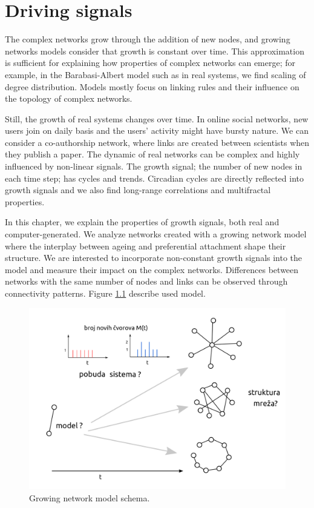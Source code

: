 
\chapter{Driving signals} %
\label{Ch:signals} %

The complex networks grow through the addition of new nodes, and growing networks models consider that growth is constant over time. This approximation is sufficient for explaining how properties of complex networks can emerge; for example, in the Barabasi-Albert model such as in real systems, we find scaling of degree distribution. Models mostly focus on linking rules and their influence on the topology of complex networks. 

Still, the growth of real systems changes over time. In online social networks, new users join on daily basis and the users' activity might have bursty nature. We can consider a co-authorship network, where links are created between scientists when they publish a paper. The dynamic of real networks can be complex and highly influenced by non-linear signals. The growth signal; the number of new nodes in each time step; has cycles and trends. Circadian cycles are directly reflected into growth signals and we also find long-range correlations and multifractal properties. 

In this chapter, we explain the properties of growth signals, both real and computer-generated. We analyze networks created with a growing network model where the interplay between ageing and preferential attachment shape their structure. We are interested to incorporate non-constant growth signals into the model and measure their impact on the complex networks. Differences between networks with the same number of nodes and links can be observed through connectivity patterns. Figure \ref{fig:ciljevi} describe used model. 
   

\begin{figure}[!ht]
	\centering
	\includegraphics[width=0.6\linewidth]{Figures/ciljevi3.png}
	\caption{Growing network model schema.}
	\label{fig:ciljevi}
\end{figure}

